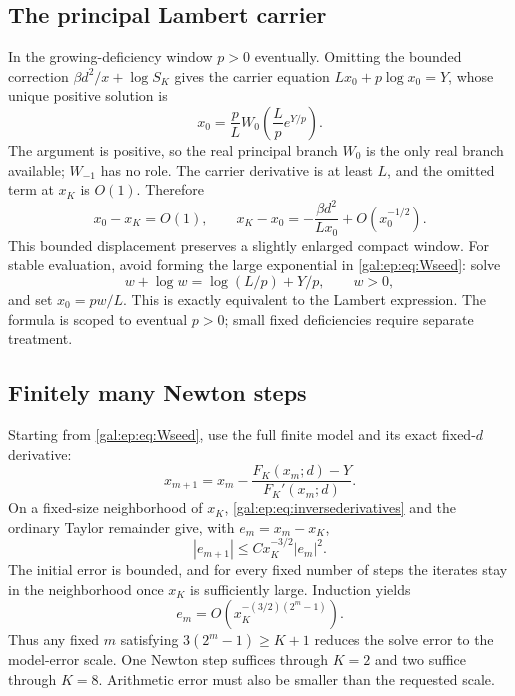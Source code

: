 \documentclass[11pt,letterpaper]{article}
\numberwithin{equation}{section}
\theoremstyle{definition}\newtheorem{definition}[theorem]{Definition}
\theoremstyle{remark}\newtheorem{remark}[theorem]{Remark}
\begin{document}
\subsection{The principal Lambert carrier}
In the growing-deficiency window $p>0$ eventually. Omitting the bounded correction $\beta d^2/x+\log S_K$ gives the carrier equation $Lx_0+p\log x_0=Y$, whose unique positive solution is
\begin{equation}\label{gal:ep:eq:Wseed}
\boxed{\quad x_0=\frac pL W_0\!\left(\frac Lp e^{Y/p}\right).\quad}
\end{equation}
The argument is positive, so the real principal branch $W_0$ is the only real branch available; $W_{-1}$ has no role. The carrier derivative is at least $L$, and the omitted term at $x_K$ is $O(1)$. Therefore
\begin{equation}\label{gal:ep:eq:seeddistance}
x_0-x_K=O(1),\qquad
x_K-x_0=-\frac{\beta d^2}{Lx_0}+O(x_0^{-1/2}).
\end{equation}
This bounded displacement preserves a slightly enlarged compact window. For stable evaluation, avoid forming the large exponential in \eqref{gal:ep:eq:Wseed}: solve
\[
w+\log w=\log(L/p)+Y/p,\qquad w>0,
\]
and set $x_0=pw/L$. This is exactly equivalent to the Lambert expression. The formula is scoped to eventual $p>0$; small fixed deficiencies require separate treatment.

\subsection{Finitely many Newton steps}
Starting from \eqref{gal:ep:eq:Wseed}, use the full finite model and its exact fixed-$d$ derivative:
\begin{equation}\label{gal:ep:eq:newton}
x_{m+1}=x_m-\frac{F_K(x_m;d)-Y}{F_K'(x_m;d)}.
\end{equation}
On a fixed-size neighborhood of $x_K$, \eqref{gal:ep:eq:inversederivatives} and the ordinary Taylor remainder give, with $e_m=x_m-x_K$,
\[
|e_{m+1}|\le Cx_K^{-3/2}|e_m|^2.
\]
The initial error is bounded, and for every fixed number of steps the iterates stay in the neighborhood once $x_K$ is sufficiently large. Induction yields
\begin{equation}\label{gal:ep:eq:newtonrate}
e_m=O\!\left(x_K^{-(3/2)(2^m-1)}\right).
\end{equation}
Thus any fixed $m$ satisfying $3(2^m-1)\ge K+1$ reduces the solve error to the model-error scale. One Newton step suffices through $K=2$ and two suffice through $K=8$. Arithmetic error must also be smaller than the requested scale.
\end{document}
